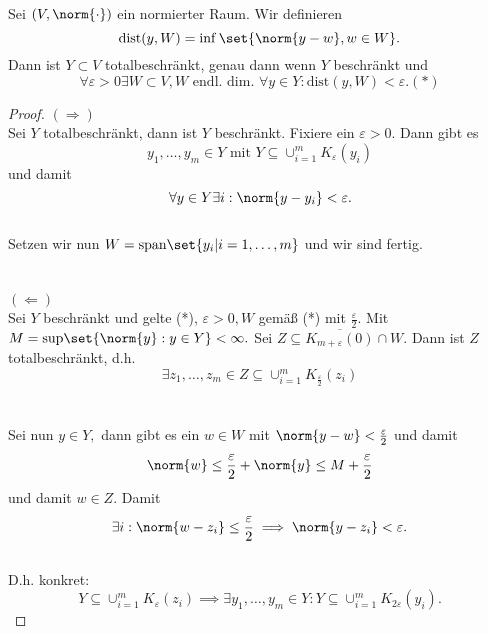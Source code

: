 \begin{theorem} Sei $(V, \norm{\cdot})$ ein normierter Raum. Wir definieren \[\text{dist}(y, W) = \inf{\set{\norm{y-w}, w \in W}}.\] Dann ist $Y \subset V$ totalbeschränkt, genau dann wenn $Y$ beschränkt und \[\forall \varepsilon >0 \exists W \subset V, W \text{ endl. dim. } \forall y \in Y: \text{dist}(y, W) < \varepsilon. (*)\]
	
	\begin{proof} $(\Rightarrow)$ \\
		
		Sei $Y$ totalbeschränkt, dann ist $Y$ beschränkt. Fixiere ein $\varepsilon > 0.$ Dann gibt es \[y_1, \ldots, y_m \in Y \text{ mit } Y \subseteq \cup_{i = 1}^m K_{\varepsilon}(y_i)\] und damit \[\forall y \in Y \exists i: \norm{y- y_i} < \varepsilon.\] \\
		Setzen wir nun $W = \text{span}\set{y_i | i = 1, \ldots, m}$ und wir sind fertig. \\ \\ \\
		$(\Leftarrow)$ \\
		Sei $Y$ beschränkt und gelte (*), $\varepsilon > 0, W$ gemäß (*) mit $\frac{\varepsilon}{2}.$ Mit $M = \text{sup}{\set{\norm{y}: y \in Y}} < \infty.$ Sei $Z\subseteq \overline{K_{m + \varepsilon}(0)} \cap W.$ Dann ist $Z$ totalbeschränkt, d.h. \[\exists z_1, \ldots, z_m \in Z \subseteq \cup_{i = 1}^m K_{\frac{\varepsilon}{2}}(z_i)\] \\ \\
		Sei nun $y \in Y,$ dann gibt es ein $w \in W$ mit $\norm{y - w} < \frac{\varepsilon}{2}$ und damit \[\norm{w} \leq \frac{\varepsilon}{2} + \norm{y} \leq M + \frac{\varepsilon}{2}\] und damit $w \in Z.$ Damit \[\exists i: \norm{w - z_i} \leq \frac{\varepsilon}{2} \implies \norm{y-z_i} < \varepsilon.\] \\ D.h. konkret: \\
		\[Y \subseteq \cup_{i = 1}^m K_{\varepsilon}(z_i) \implies \exists y_1, \ldots, y_m \in Y: Y \subseteq \cup_{i = 1}^m K_{2 \varepsilon}(y_i).\]
	\end{proof}
	
\end{theorem}